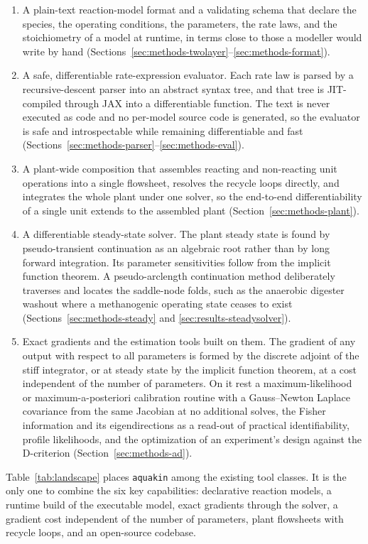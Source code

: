 \documentclass{article}
\begin{document}
\begin{enumerate}
\item A plain-text reaction-model format and a validating schema that declare the species, the operating conditions, the parameters, the rate laws, and the stoichiometry of a model at runtime, in terms close to those a modeller would write by hand (Sections~\ref{sec:methods-twolayer}--\ref{sec:methods-format}).
\item A safe, differentiable rate-expression evaluator. Each rate law is parsed by a recursive-descent parser into an abstract syntax tree, and that tree is JIT-compiled through JAX into a differentiable function. The text is never executed as code and no per-model source code is generated, so the evaluator is safe and introspectable while remaining differentiable and fast (Sections~\ref{sec:methods-parser}--\ref{sec:methods-eval}).
\item A plant-wide composition that assembles reacting and non-reacting unit operations into a single flowsheet, resolves the recycle loops directly, and integrates the whole plant under one solver, so the end-to-end differentiability of a single unit extends to the assembled plant (Section~\ref{sec:methods-plant}).
\item A differentiable steady-state solver. The plant steady state is found by pseudo-transient continuation as an algebraic root rather than by long forward integration. Its parameter sensitivities follow from the implicit function theorem. A pseudo-arclength continuation method deliberately traverses and locates the saddle-node folds, such as the anaerobic digester washout where a methanogenic operating state ceases to exist (Sections~\ref{sec:methods-steady} and \ref{sec:results-steadysolver}).
\item Exact gradients and the estimation tools built on them. The gradient of any output with respect to all parameters is formed by the discrete adjoint of the stiff integrator, or at steady state by the implicit function theorem, at a cost independent of the number of parameters. On it rest a maximum-likelihood or maximum-a-posteriori calibration routine with a Gauss--Newton Laplace covariance from the same Jacobian at no additional solves, the Fisher information and its eigendirections as a read-out of practical identifiability, profile likelihoods, and the optimization of an experiment's design against the D-criterion (Section~\ref{sec:methods-ad}).
\end{enumerate}

Table~\ref{tab:landscape} places \texttt{aquakin} among the existing tool classes. It is the only one to combine the six key capabilities: declarative reaction models, a runtime build of the executable model, exact gradients through the solver, a gradient cost independent of the number of parameters, plant flowsheets with recycle loops, and an open-source codebase. 
\end{document}
